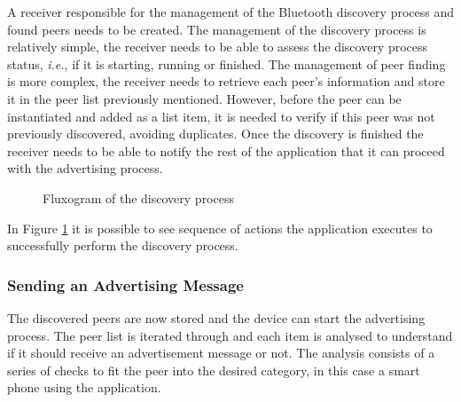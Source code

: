 A receiver responsible for the management of the Bluetooth discovery process and found peers needs to be created. The management of the discovery process is relatively simple, the receiver needs to be able to assess the discovery process status, \textit{i.e.}, if it is starting, running or finished. The management of peer finding is more complex, the receiver needs to retrieve each peer's information and store it in the peer list previously mentioned. However, before the peer can be instantiated and added as a list item, it is needed to verify if this peer was not previously discovered, avoiding duplicates. Once the discovery is finished the receiver needs to be able to notify the rest of the application that it can proceed with the advertising process.

\begin{figure}[ht]
   \noindent{}
	\caption{\label{fig:discflux} Fluxogram of the discovery process}
\end{figure}

In Figure \ref{fig:discflux} it is possible to see sequence of actions the application executes to successfully perform the discovery process.

\subsubsection{Sending an Advertising Message}
\label{subsubsec:sendadv}

The discovered peers are now stored and the device can start the advertising process. The peer list is iterated through and each item is analysed to understand if it should receive an advertisement message or not. The analysis consists of a series of checks to fit the peer into the desired category, in this case a smart phone using the application.

